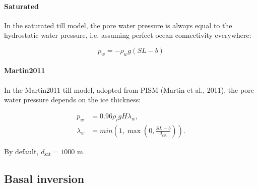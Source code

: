 \documentclass{article}
\begin{document}
\paragraph{Saturated}
In the saturated till model, the pore water pressure is always equal to the hydrostatic water pressure, i.e. assuming perfect ocean connectivity everywhere:

\begin{equation} \label{eq:slid_hydro_01}
p_w = -\rho_w g \left( SL - b \right)
\end{equation}

\paragraph{Martin2011}
In the Martin2011 till model, adopted from PISM (Martin et al., 2011), the pore water pressure depends on the ice thickness:

\begin{align} \label{eq:slid_hydro_02}
p_w &= 0.96 \rho_i g H \lambda_w, \\
\lambda_w &= min \left( 1, \max \left( 0, \frac{SL - b}{d_{\textrm{sat}} } \right) \right).
\end{align}

By default, $d_{\textrm{sat}} = 1000$ m.

\newpage
\subsection{Basal inversion}
\end{document}
